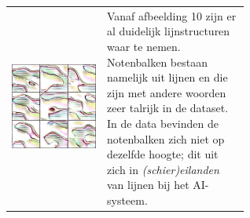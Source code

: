 \documentclass[dutch, twoside, a4paper, 10pt]{article}
\begin{document}
\begin{table}[H]
\begin{tabular}{c p{0.6\linewidth}}
          \includegraphics[scale=0.18]{10-interp.jpg}   & \vspace{-10\baselineskip}Vanaf afbeelding 10 zijn er al duidelijk lijnstructuren waar te nemen. Notenbalken bestaan namelijk uit lijnen en die zijn met andere woorden zeer talrijk in de dataset. In de data bevinden de notenbalken zich niet op dezelfde hoogte; dit uit zich in \textit{(schier)eilanden} van lijnen bij het AI-systeem. \\

\end{tabular}
\end{table}
\end{document}
